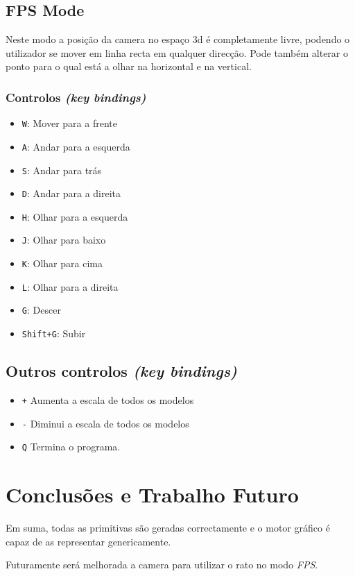 \documentclass[a4paper]{article}
\begin{document}
\subsection{FPS Mode}

Neste modo a posição da camera no espaço 3d é completamente livre, podendo o utilizador se mover em linha recta em qualquer direcção. Pode também alterar o ponto para o qual está a olhar na horizontal e na vertical.
\subsubsection{Controlos \textit{(key bindings)}}

\begin{itemize}
    \item \texttt{W}: Mover para a frente
    \item \texttt{A}: Andar para a esquerda
    \item \texttt{S}: Andar para trás
    \item \texttt{D}: Andar para a direita
    \item \texttt{H}: Olhar para a esquerda
    \item \texttt{J}: Olhar para baixo
    \item \texttt{K}: Olhar para cima
    \item \texttt{L}: Olhar para a direita
    \item \texttt{G}: Descer
    \item \texttt{Shift+G}: Subir
\end{itemize}


\subsection{Outros controlos \textit{(key bindings)}}

\begin{itemize}
    \item \texttt{+} Aumenta a escala de todos os modelos
    \item \texttt{-} Diminui a escala de todos os modelos
    \item \texttt{Q} Termina o programa.
\end{itemize}

\section{Conclusões e Trabalho Futuro}
Em suma, todas as primitivas são geradas correctamente e o motor gráfico é capaz de as representar genericamente.

Futuramente será melhorada a camera para utilizar o rato no modo \textit{FPS}.
\end{document}

